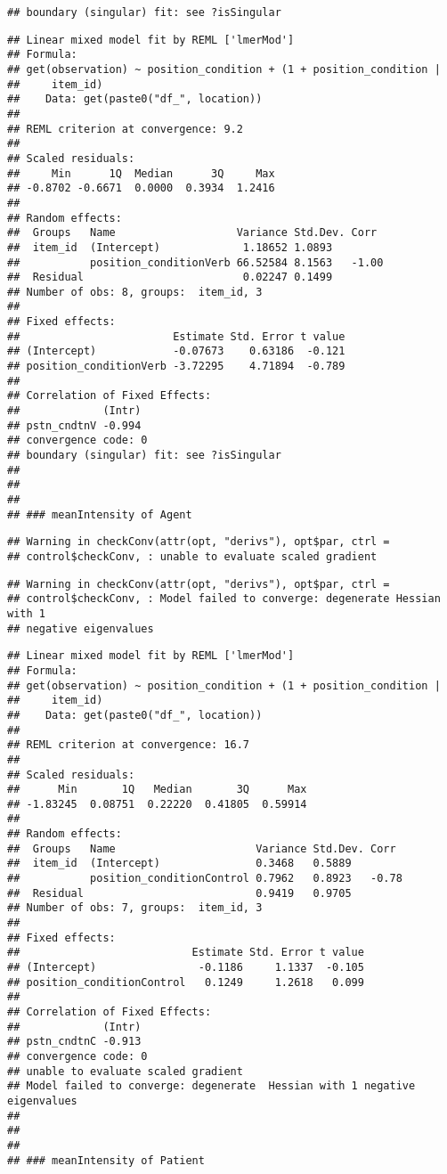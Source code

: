\documentclass[]{article}
\begin{document}
\begin{verbatim}
## boundary (singular) fit: see ?isSingular
\end{verbatim}

\begin{verbatim}
## Linear mixed model fit by REML ['lmerMod']
## Formula: 
## get(observation) ~ position_condition + (1 + position_condition |  
##     item_id)
##    Data: get(paste0("df_", location))
## 
## REML criterion at convergence: 9.2
## 
## Scaled residuals: 
##     Min      1Q  Median      3Q     Max 
## -0.8702 -0.6671  0.0000  0.3934  1.2416 
## 
## Random effects:
##  Groups   Name                   Variance Std.Dev. Corr 
##  item_id  (Intercept)             1.18652 1.0893        
##           position_conditionVerb 66.52584 8.1563   -1.00
##  Residual                         0.02247 0.1499        
## Number of obs: 8, groups:  item_id, 3
## 
## Fixed effects:
##                        Estimate Std. Error t value
## (Intercept)            -0.07673    0.63186  -0.121
## position_conditionVerb -3.72295    4.71894  -0.789
## 
## Correlation of Fixed Effects:
##             (Intr)
## pstn_cndtnV -0.994
## convergence code: 0
## boundary (singular) fit: see ?isSingular
## 
##   
##   
## ### meanIntensity of Agent
\end{verbatim}

\begin{verbatim}
## Warning in checkConv(attr(opt, "derivs"), opt$par, ctrl =
## control$checkConv, : unable to evaluate scaled gradient
\end{verbatim}

\begin{verbatim}
## Warning in checkConv(attr(opt, "derivs"), opt$par, ctrl =
## control$checkConv, : Model failed to converge: degenerate Hessian with 1
## negative eigenvalues
\end{verbatim}

\begin{verbatim}
## Linear mixed model fit by REML ['lmerMod']
## Formula: 
## get(observation) ~ position_condition + (1 + position_condition |  
##     item_id)
##    Data: get(paste0("df_", location))
## 
## REML criterion at convergence: 16.7
## 
## Scaled residuals: 
##      Min       1Q   Median       3Q      Max 
## -1.83245  0.08751  0.22220  0.41805  0.59914 
## 
## Random effects:
##  Groups   Name                      Variance Std.Dev. Corr 
##  item_id  (Intercept)               0.3468   0.5889        
##           position_conditionControl 0.7962   0.8923   -0.78
##  Residual                           0.9419   0.9705        
## Number of obs: 7, groups:  item_id, 3
## 
## Fixed effects:
##                           Estimate Std. Error t value
## (Intercept)                -0.1186     1.1337  -0.105
## position_conditionControl   0.1249     1.2618   0.099
## 
## Correlation of Fixed Effects:
##             (Intr)
## pstn_cndtnC -0.913
## convergence code: 0
## unable to evaluate scaled gradient
## Model failed to converge: degenerate  Hessian with 1 negative eigenvalues
## 
##   
##   
## ### meanIntensity of Patient
\end{verbatim}
\end{document}
